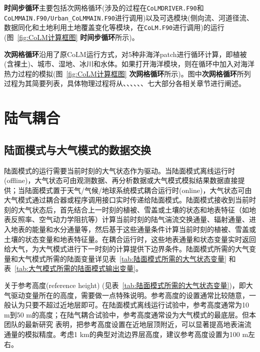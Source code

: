 \textbf{时间步循环}主要包括次网格循环(涉及的过程在\texttt{CoLMDRIVER.F90}和\texttt{CoLMMAIN.F90\allowbreak /Urban\allowbreak \_CoLMMAIN.F90}进行调用)以及可选模块(侧向流、河道径流、数据同化和土地利用土地覆盖变化等模块，在\texttt{CoLM.F90}进行调用)的运行(图~\ref{fig:CoLM计算框图} \textbf{时间步循环}所示)。

\textbf{次网格循环}沿用了原CoLM运行方式，对5种非海洋patch进行循环计算，即植被(含裸土)、城市、湿地、冰川和水体。如果打开海洋模块，则在循环中加入对海洋热力过程的模拟(图~\ref{fig:CoLM计算框图} \textbf{次网格循环}所示)。图中\textbf{次网格循环}所列过程为其简要列表，具体物理过程将从、、、、、、七大部分各相关章节进行阐述。

\section{陆气耦合}\label{陆气耦合}
\subsection{陆面模式与大气模式的数据交换}
陆面模式的运行需要当前时刻的大气状态作为驱动。当陆面模式离线运行时(offline)，大气状态可由观测数据、再分析数据或大气模式模拟结果数据直接提供；当陆面模式置于天气/气候/地球系统模式耦合运行时(online)，大气状态可由大气模式通过耦合器或程序调用接口实时传递给陆面模式。陆面模式接收到当前时刻的大气状态后，首先结合上一时刻的植被、雪盖或土壤的状态和地表特征（如地表反照率、空气动力学阻抗等）计算当前时刻的陆气湍流交换通量、辐射通量、进入地表的能量和水分通量等，然后基于这些通量条件计算当前时刻的植被、雪盖或土壤的状态变量和地表特征量。在耦合运行时，这些地表通量和状态变量实时返回给大气，为大气模式进行下一时刻的计算提供下边界条件。陆面模式所需的大气变量和大气模式所需的陆面变量详见表~\ref{tab:陆面模式所需的大气状态变量} 和表~\ref{tab:大气模式所需的陆面模式输出变量}。

关于参考高度(reference height) (见表~\ref{tab:陆面模式所需的大气状态变量})，即大气驱动变量所在的高度，需要做一点特殊说明。参考高度的设置通常比较随意，一般认为只要不超过近地层即可。在陆面模式离线运行试验中，参考高度通常为10 m到50 m的高度；在陆气耦合试验中，参考高度通常设为大气模式的最底层。但本团队的最新研究\citep{liu2023referenceheight} 表明，把参考高度设置在近地层顶附近，可以显著提高地表湍流通量的模拟精度。考虑1 km的典型对流边界层高度，建议参考高度设置为100 m左右。

